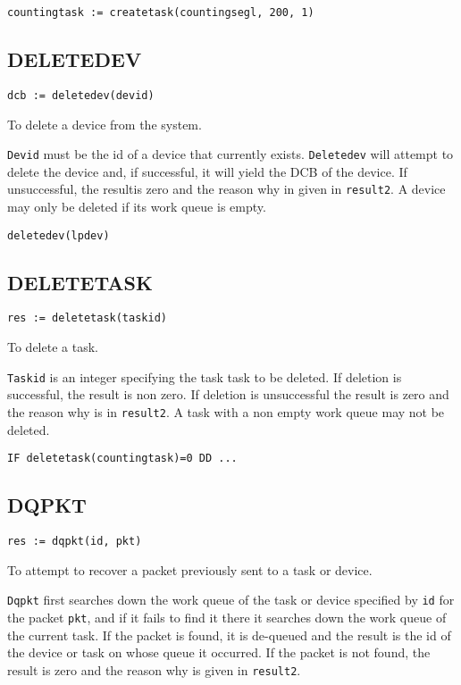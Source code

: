 \verb|countingtask := createtask(countingsegl, 200, 1)|

\subsection{DELETEDEV}

\verb|dcb := deletedev(devid)|

  To delete a device from the system.


     \verb|Devid| must be the id of a device that currently exists.
\verb|Deletedev| will attempt to delete the device and, if successful,
it will yield the DCB of the device.  If unsuccessful, the resultis
zero and the reason why in given in \verb|result2|.  A device may only
be deleted if its work queue is empty.

\verb|deletedev(lpdev)|

\subsection{DELETETASK}

\verb|res := deletetask(taskid)|

  To delete a task.


     \verb|Taskid| is an integer specifying the task task to be
deleted.  If deletion is successful, the result is non zero.  If
deletion is unsuccessful the result is zero and the reason why is in
\verb|result2|.  A task with a non empty work queue may not be deleted.

\verb|IF deletetask(countingtask)=0 DD ...|



\subsection{DQPKT}

\verb|res := dqpkt(id, pkt)|

 To attempt to recover a packet previously sent to a
task or device.


     \verb|Dqpkt| first searches down the work queue of the task or
device specified by \verb|id| for the packet \verb|pkt|, and if it
fails to find it there it searches down the work queue of the current
task.  If the packet is found, it is de-queued and the result is the
id of the device or task on whose queue it occurred.  If the packet is
not found, the result is zero and the reason why is given in
\verb|result2|.

